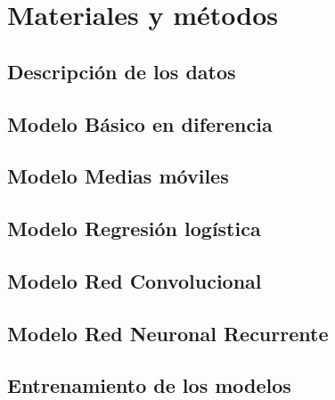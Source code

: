 \section{Materiales y métodos}

\subsection{Descripción de los datos}
\lipsum[1]


\subsection{Modelo Básico en diferencia}
\lipsum[1]

\subsection{Modelo Medias móviles}
\lipsum[1]

\subsection{Modelo Regresión logística}
\lipsum[1]

\subsection{Modelo Red Convolucional}
\lipsum[1]

\subsection{Modelo Red Neuronal Recurrente}
\lipsum[1]

\subsection{Entrenamiento de los modelos}
\lipsum[1]

\clearpage